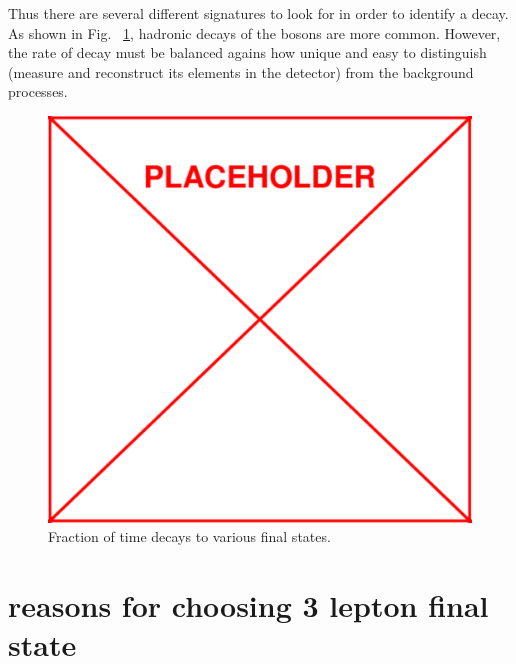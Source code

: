 	Thus there are several different signatures to look for in order to identify a \ttZ decay. As shown in Fig. ~\ref{fig:ttZ_decay_rates}, hadronic decays of the bosons are more common. However, the rate of decay must be balanced agains how unique and easy to distinguish (measure and reconstruct its elements in the detector) from the background processes.
	
	\begin{figure}[h]
\begin{center}
\includegraphics[width=0.48\linewidth]{Figs/placeholder.pdf}
\caption{\label{fig:ttZ_decay_rates}
Fraction of time \ttZ decays to various final states.
}
\end{center}
\end{figure} 

	
	\section{reasons for choosing 3 lepton final state}
